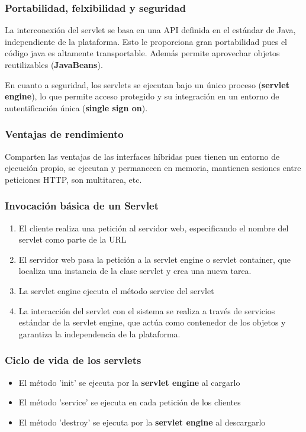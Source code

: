 \documentclass{apuntes}
\begin{document}
\subsubsection{Portabilidad, felxibilidad y seguridad}
La interconexión del servlet se basa en una API definida en el estándar de Java, independiente de la plataforma. Esto le proporciona gran portabilidad pues el código java es altamente transportable. Además permite aprovechar objetos reutilizables (\textbf{JavaBeans}).

En cuanto a seguridad, los servlets se ejecutan bajo un único proceso (\textbf{servlet engine}), lo que permite acceso protegido y su integración en un entorno de autentificación única (\textbf{single sign on}).

\subsubsection{Ventajas de rendimiento}
Comparten las ventajas de las interfaces híbridas pues tienen un entorno de ejecución propio, se ejecutan y permanecen en memoria, mantienen sesiones entre peticiones HTTP, son multitarea, etc.

\subsubsection{Invocación básica de un Servlet}
\begin{enumerate}
\item El cliente realiza una petición al servidor web, especificando el nombre del servlet como parte de la URL
\item El servidor web pasa la petición a la servlet engine o servlet container, que localiza una instancia de la clase servlet y crea una nueva tarea.
\item La servlet engine ejecuta el método service del servlet
\item La interacción del servlet con el sistema se realiza a través de servicios estándar de la servlet engine, que actúa como contenedor de los objetos y garantiza la independencia de la plataforma.
\end{enumerate}

\subsubsection{Ciclo de vida de los servlets}
\begin{itemize}
\item El método 'init' se ejecuta por la \textbf{servlet engine} al cargarlo
\item El método 'service' se ejecuta en cada petición de los clientes
\item El método 'destroy' se ejecuta por la \textbf{servlet engine} al descargarlo
\end{itemize}
\end{document}
